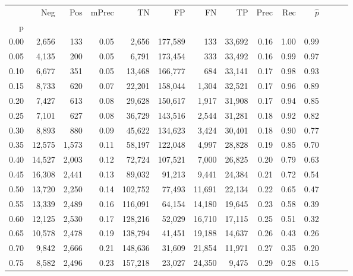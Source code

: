 \begin{tabular}{rrrrrrrrrrrrrr}
\toprule
{} &     Neg &    Pos & mPrec &       TN &       FP &      FN &      TP &  Prec &   Rec & $\hat{p}$ \\
p    &         &        &       &          &          &         &         &       &       &           \\
\midrule
0.00 &   2,656 &    133 &  0.05 &    2,656 &  177,589 &     133 &  33,692 &  0.16 &  1.00 &      0.99 \\
0.05 &   4,135 &    200 &  0.05 &    6,791 &  173,454 &     333 &  33,492 &  0.16 &  0.99 &      0.97 \\
0.10 &   6,677 &    351 &  0.05 &   13,468 &  166,777 &     684 &  33,141 &  0.17 &  0.98 &      0.93 \\
0.15 &   8,733 &    620 &  0.07 &   22,201 &  158,044 &   1,304 &  32,521 &  0.17 &  0.96 &      0.89 \\
0.20 &   7,427 &    613 &  0.08 &   29,628 &  150,617 &   1,917 &  31,908 &  0.17 &  0.94 &      0.85 \\
0.25 &   7,101 &    627 &  0.08 &   36,729 &  143,516 &   2,544 &  31,281 &  0.18 &  0.92 &      0.82 \\
0.30 &   8,893 &    880 &  0.09 &   45,622 &  134,623 &   3,424 &  30,401 &  0.18 &  0.90 &      0.77 \\
0.35 &  12,575 &  1,573 &  0.11 &   58,197 &  122,048 &   4,997 &  28,828 &  0.19 &  0.85 &      0.70 \\
0.40 &  14,527 &  2,003 &  0.12 &   72,724 &  107,521 &   7,000 &  26,825 &  0.20 &  0.79 &      0.63 \\
0.45 &  16,308 &  2,441 &  0.13 &   89,032 &   91,213 &   9,441 &  24,384 &  0.21 &  0.72 &      0.54 \\
0.50 &  13,720 &  2,250 &  0.14 &  102,752 &   77,493 &  11,691 &  22,134 &  0.22 &  0.65 &      0.47 \\
0.55 &  13,339 &  2,489 &  0.16 &  116,091 &   64,154 &  14,180 &  19,645 &  0.23 &  0.58 &      0.39 \\
0.60 &  12,125 &  2,530 &  0.17 &  128,216 &   52,029 &  16,710 &  17,115 &  0.25 &  0.51 &      0.32 \\
0.65 &  10,578 &  2,478 &  0.19 &  138,794 &   41,451 &  19,188 &  14,637 &  0.26 &  0.43 &      0.26 \\
0.70 &   9,842 &  2,666 &  0.21 &  148,636 &   31,609 &  21,854 &  11,971 &  0.27 &  0.35 &      0.20 \\
0.75 &   8,582 &  2,496 &  0.23 &  157,218 &   23,027 &  24,350 &   9,475 &  0.29 &  0.28 &      0.15 \\

\end{tabular}
